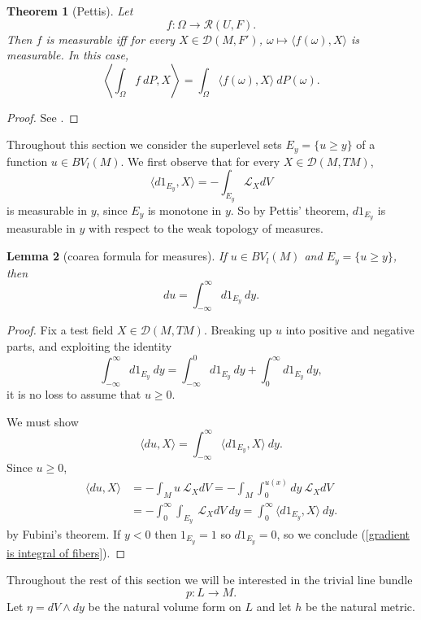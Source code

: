 \documentclass[reqno,12pt,letterpaper]{amsart}
\newtheorem{theorem}{Theorem}[section]
\newtheorem{lemma}[theorem]{Lemma}
\theoremstyle{definition}
\numberwithin{equation}{section}
\begin{document}
\begin{theorem}[Pettis]
Let
$$f: \Omega \to \mathcal R(U, F).$$
Then $f$ is measurable iff for every $X \in \mathcal D(M, F')$, $\omega \mapsto \langle f(\omega), X\rangle$ is measurable.
In this case,
$$\left\langle \int_\Omega f ~dP, X\right\rangle = \int_\Omega \langle f(\omega), X\rangle ~dP(\omega).$$
\end{theorem}
\begin{proof}
See \cite[Chapter V]{yosida2012functional}.
\end{proof}

Throughout this section we consider the superlevel sets $E_y = \{u \geq y\}$ of a function $u \in BV_l(M)$.
We first observe that for every $X \in \mathcal D(M, TM)$,
$$\langle d1_{E_y}, X\rangle = -\int_{E_y} \mathcal L_XdV$$
is measurable in $y$, since $E_y$ is monotone in $y$.
So by Pettis' theorem, $d1_{E_y}$ is measurable in $y$ with respect to the weak topology of measures.

\begin{lemma}[coarea formula for measures]\label{Coarea1}
If $u \in BV_l(M)$ and $E_y = \{u \geq y\}$, then
$$du = \int_{-\infty}^\infty d1_{E_y} ~dy.$$
\end{lemma}
\begin{proof}
Fix a test field $X \in \mathcal D(M, TM)$.
Breaking up $u$ into positive and negative parts, and exploiting the identity
$$\int_{-\infty}^\infty d1_{E_y} ~dy = \int_{-\infty}^0 d1_{E_y} ~dy + \int_0^\infty d1_{E_y} ~dy,$$
it is no loss to assume that $u \geq 0$.

We must show
\begin{equation}
\label{gradient is integral of fibers}
\langle du, X\rangle = \int_{-\infty}^\infty \langle d1_{E_y}, X\rangle ~dy.
\end{equation}
Since $u \geq 0$,
\begin{align*}
\langle du, X\rangle &= -\int_M u~\mathcal L_XdV = -\int_M \int_0^{u(x)} dy ~\mathcal L_XdV\\
&= -\int_0^\infty \int_{E_y} ~\mathcal L_XdV ~dy = \int_0^\infty \langle d1_{E_y}, X\rangle ~dy.
\end{align*}
by Fubini's theorem.
If $y < 0$ then $1_{E_y} = 1$ so $d1_{E_y} = 0$, so we conclude (\ref{gradient is integral of fibers}).
\end{proof}

Throughout the rest of this section we will be interested in the trivial line bundle
$$p: L \to M.$$
Let $\eta = dV \wedge dy$ be the natural volume form on $L$ and let $h$ be the natural metric.
\end{document}
